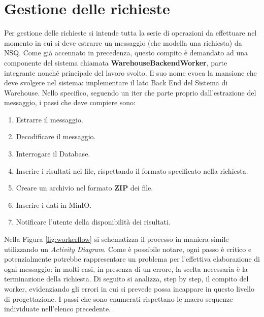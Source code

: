 \section{Gestione delle richieste} 

Per gestione delle richieste si intende tutta la serie di operazioni da effettuare nel momento in cui si deve estrarre un messaggio (che modella una richiesta) da NSQ. 
Come già accennato in precedenza, questo compito è demandato ad una componente del sistema chiamata \textbf{WarehouseBackendWorker}, parte integrante nonché principale del lavoro svolto. Il suo nome evoca la mansione che deve svolgere nel sistema: implementare il lato Back End del Sistema di Warehouse. Nello specifico, seguendo un iter che parte proprio dall'estrazione del messaggio, i passi che deve compiere sono:
\begin{enumerate}
    \item Estrarre il messaggio.
    \item Decodificare il messaggio.
    \item Interrogare il Database.
    \item Inserire i risultati nei file, rispettando il formato specificato nella richiesta.
    \item Creare un archivio nel formato \textbf{ZIP} dei file.
    \item Inserire i dati in MinIO.
    \item Notificare l'utente della disponibilità dei risultati.
\end{enumerate}
Nella Figura \ref{fig:workerflow} si schematizza il processo in maniera simile utilizzando un \textit{Activity Diagram}. Come è possibile notare, ogni passo è critico e potenzialmente potrebbe rappresentare un problema per l'effettiva elaborazione di ogni messaggio: in molti casi, in presenza di un errore, la scelta necessaria è la terminazione della richiesta. Di seguito si analizza, step by step, il compito del worker, evidenziando gli errori in cui si prevede possa incappare in questo livello di progettazione. I passi che sono enumerati rispettano le macro sequenze individuate nell'elenco precedente.
